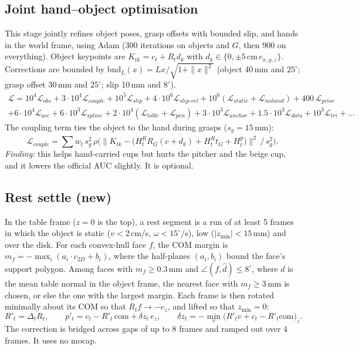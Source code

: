 \documentclass[10pt,a4paper]{article}
\begin{document}
\subsection{Joint hand--object optimisation}
This stage jointly refines object poses, grasp offsets with bounded slip, and hands in the world frame, using Adam (300 iterations on objects and $G$, then 900 on everything).
Object keypoints are $K_{tk}=c_t+R_td_k$ with $d_k\in\{0,\pm5\,\text{cm}\,e_{x,y,z}\}$. Corrections are bounded by
$\mathrm{bnd}_L(x)=Lx/\sqrt{1+\|x\|^2}$ (object 40\,mm and $25^\circ$; grasp offset 30\,mm and $25^\circ$; slip 10\,mm and $8^\circ$).
\begin{multline}
\mathcal L=10^4\mathcal L_{obs}+3{\cdot}10^4\mathcal L_{couple}+10^5\mathcal L_{slip}+4{\cdot}10^6\mathcal L_{slip\text{-}vel}
+10^6(\mathcal L_{static}+\mathcal L_{nohand})+400\,\mathcal L_{prior}\\
+6{\cdot}10^4\mathcal L_{acc}+6{\cdot}10^3\mathcal L_{spline}+2{\cdot}10^4(\mathcal L_{table}+\mathcal L_{pen})
+3{\cdot}10^3\mathcal L_{anchor}+1.5{\cdot}10^3\mathcal L_{data}+10^3\mathcal L_{tri}+\dots
\end{multline}
The coupling term ties the object to the hand during grasps ($s_g=15$\,mm):
\begin{equation}
\mathcal L_{couple}=\sum w_t\, s_g^2\,\rho\Big(\overline{\big\|K_{tk}-\big(H^R_tR_G(c+d_k)+H^R_tt_G+H^p_t\big)\big\|^2}\,/\,s_g^2\Big).
\end{equation}
\emph{Finding:} this helps hand-carried cups but hurts the pitcher and the beige cup, and it lowers the official AUC slightly. It is optional.

\subsection{Rest settle (new)}
\label{sec:settle}
In the table frame ($z=0$ is the top), a rest segment is a run of at least 5 frames in which the object is static ($v<2$\,cm/s, $\omega<15^\circ$/s), low
($|z_{\min}|<15$\,mm) and over the disk. For each convex-hull face $f$, the COM margin is
$m_f=-\max_i(a_i\cdot c_{2D}+b_i)$, where the half-planes $(a_i,b_i)$ bound the face's support polygon. Among faces with $m_f\ge0.3$\,mm and
$\angle(f,\hat d)\le8^\circ$, where $\hat d$ is the mean table normal in the object frame, the nearest face with $m_f\ge3$\,mm is chosen, or else the one with the largest margin.
Each frame is then rotated minimally about its COM so that $R_tf\to-e_z$, and lifted so that $z_{\min}=0$:
\begin{equation}
R'_t=\Delta_tR_t,\qquad p'_t=c_t-R'_t\,\mathrm{com}+\delta z_t\,e_z,\qquad \delta z_t=-\min_v\big(R'_tv+c_t-R'_t\mathrm{com}\big)_z .
\end{equation}
The correction is bridged across gaps of up to 8 frames and ramped out over 4 frames. It uses no mocap.
\end{document}
